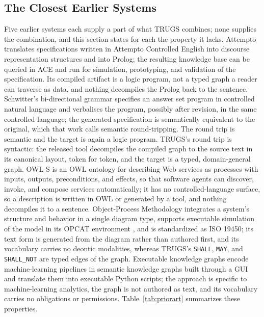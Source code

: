 \documentclass{article}
\begin{document}
\subsection{The Closest Earlier Systems}
\label{sec:priorart}

Five earlier systems each supply a part of what TRUGS combines; none supplies the combination, and this section states for each the property it lacks. Attempto \citep{schwitter1996attempto, fuchs2008attempto} translates specifications written in Attempto Controlled English into discourse representation structures and into Prolog; the resulting knowledge base can be queried in ACE and run for simulation, prototyping, and validation of the specification. Its compiled artifact is a logic program, not a typed graph a reader can traverse as data, and nothing decompiles the Prolog back to the sentence. Schwitter's bi-directional grammar \citep{schwitter2018asp} specifies an answer set program in controlled natural language and verbalises the program, possibly after revision, in the same controlled language; the generated specification is semantically equivalent to the original, which that work calls semantic round-tripping. The round trip is semantic and the target is again a logic program. TRUGS's round trip is syntactic: the released tool decompiles the compiled graph to the source text in its canonical layout, token for token, and the target is a typed, domain-general graph. OWL-S \citep{owls2004} is an OWL ontology for describing Web services as processes with inputs, outputs, preconditions, and effects, so that software agents can discover, invoke, and compose services automatically; it has no controlled-language surface, so a description is written in OWL or generated by a tool, and nothing decompiles it to a sentence. Object-Process Methodology integrates a system's structure and behavior in a single diagram type, supports executable simulation of the model in its OPCAT environment \citep{yaroker2013opm, dori2003opcat}, and is standardized as ISO 19450; its text form is generated from the diagram rather than authored first, and its vocabulary carries no deontic modalities, whereas TRUGS's \texttt{SHALL}, \texttt{MAY}, and \texttt{SHALL\_NOT} are typed edges of the graph. Executable knowledge graphs \citep{zheng2022executable} encode machine-learning pipelines in semantic knowledge graphs built through a GUI and translate them into executable Python scripts; the approach is specific to machine-learning analytics, the graph is not authored as text, and its vocabulary carries no obligations or permissions. Table~\ref{tab:priorart} summarizes these properties.
\end{document}
